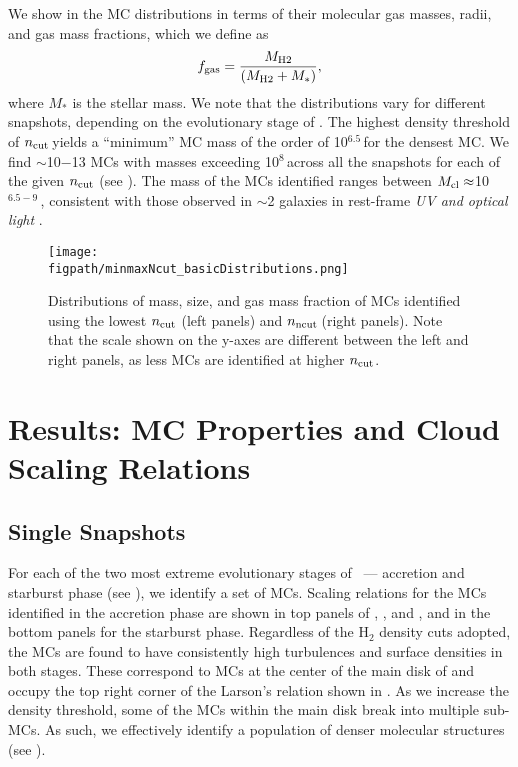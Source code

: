 \IfFileExists{emulateapjlegacy.cls}{\documentclass[iop]{emulateapjlegacy}}{\documentclass[iop]{emulateapj}}
\newcommand{\AP}[1]{({\bf \color{apcolor} AP: #1})}
\def\figpath{./Fig}
\begin{document}
We show in  the MC distributions in terms of their
molecular gas masses, radii, and gas mass fractions, which we define as
\begin{equation}
f_{\rm gas} = \frac{M_{\rm H2}} {\left(M_{\rm H2} + M_*\right)},
\end{equation}
where $M_*$ is the stellar mass.
We note that the distributions vary for different snapshots, depending on the evolutionary stage of \flower.
The highest density threshold of $n_{\rm cut}$\,\cc yields a ``minimum'' MC mass of
the order of 10$^{6.5}$\,\Msun for the densest MC.
We find $\sim$10$-$13 MCs with masses exceeding 10$^8$\,\Msun across all the
snapshots for each of the given $n_{\rm cut}$ (see ).
The mass of the MCs identified ranges between $M_{\rm cl}\approx$10$^{6.5-9}$\,\Msun, 
consistent with those observed in \z$\sim$2 galaxies in
rest-frame {\it UV and optical light} \citep{Elmegreen07a, Elmegreen09a}.

\begin{figure*}[htbp]
\centering
\texttt{[image: \\figpath/minmaxNcut\_basicDistributions.png]}
\caption{
Distributions of mass, size, and gas mass fraction of MCs identified using
the lowest $n_{\rm cut}$ (left panels) and $n_{\rm ncut}$\,\cc (right panels).
Note that the scale shown on the y-axes are different between the left and right panels, as less MCs are identified
at higher $n_{\rm cut}$.
\label{fig:dist}}
\end{figure*}



\section{Results: MC Properties and Cloud Scaling Relations}    \label{sec:results}
\subsection{Single Snapshots}  \label{sec:singless}

For each of the two most extreme evolutionary stages of \flower\ --- accretion and starburst phase (see ),
we identify a set of MCs. 
Scaling relations for the MCs identified in the accretion phase are shown in top panels 
of , , and , and in the bottom panels for the starburst phase.
Regardless of the H$_2$ density cuts adopted,
the MCs are found to have consistently high turbulences and surface densities in both stages.
These correspond to MCs at the center of the main disk of \flower and
occupy the top right corner of the Larson's relation shown in .
As we increase the density threshold, some of the MCs within the main disk break
into multiple sub-MCs.
As such, we effectively identify a population of denser molecular structures (see ).
\end{document}
